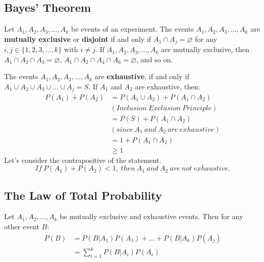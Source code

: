 \documentclass[letterpaper, 12pt]{math}
\begin{document}
\subsection*{Bayes' Theorem}
Let \( A_{1}, A_{2}, A_{3}, \dots, A_{k} \) be events of an experiment.
The events \( A_{1}, A_{2}, A_{3}, \dots, A_{k} \) are \textbf{mutually
exclusive} or \textbf{disjoint} if and only if \( A_{1} \cap A_{j} =
\varnothing \) for any \( i, j \in \{1, 2, 3, \dots, k \} \) with \( i \neq j \).
If \( A_{1}, A_{2}, A_{3}, \dots, A_{k} \) are mutually exclusive, then
\( A_{1} \cap A_{2} \cap A_{3} = \varnothing \), \( A_{1} \cap A_{2} \cap A_{4}
\cap A_{6} = \varnothing \), and so on. \par
The events \( A_{1}, A_{2}, A_{3}, \dots, A_{k} \) are \textbf{exhaustive},
if and only if \( A_{1} \cup A_{2} \cup A_{3} \cup \dots \cup A_{j} = S \).
If \( A_{1} \) and \( A_{2} \) are exhaustive, then:
\begin{align*}
  P(A_{1})+P(A_{2}) &= P(A_{1} \cup A_{2})+P(A_{1} \cap A_{2}) \\
  &(Inclusion\ Exclusion\ Principle) \\
  &= P(S)+P(A_{1} \cap A_{2}) \\
  &(since\ A_{1}\ and\ A_{2}\ are\ exhaustive) \\
  &= 1+P(A_{1} \cap A_{2}) \\
  &\geq 1
\end{align*}
Let's consider the contrapositive of the statement.
\[ If\ P(A_{1})+P(A_{2}) < 1,\ then\ A_{1}\ and\ A_{2}\ are\ not\ exhaustive. \]

\subsection*{The Law of Total Probability}
Let \( A_{1}, A_{2}, \dots, A_{k} \) be mutually exclusive and exhaustive
events. Then for any other event \( B \):
\begin{align*}
  P(B) &= P(B|A_{1})P(A_{1})+\dots+P(B|A_{k})P(A_{j}) \\
  &= \sum_{i=1}^{k}P(B|A_{i})P(A_{i})
\end{align*}
\end{document}
